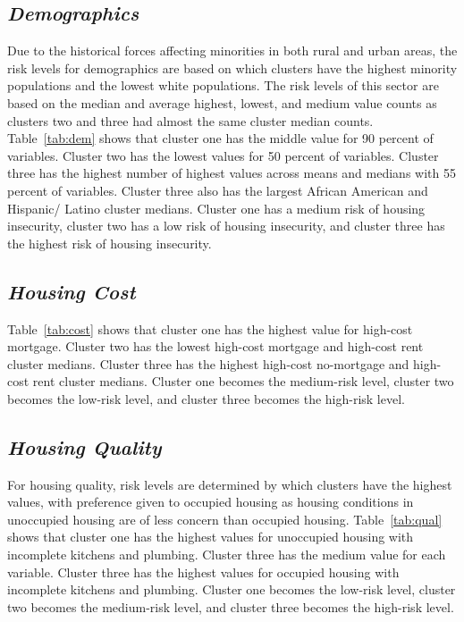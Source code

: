 \subsection{\textit{Demographics}}
Due to the historical forces affecting minorities in both rural and urban areas, the risk levels for demographics are based on which clusters have the highest minority populations and the lowest white populations. The risk levels of this sector are based on the median and average highest, lowest, and medium value counts as clusters two and three had almost the same cluster median counts. Table~\ref{tab:dem} shows that cluster one has the middle value for 90 percent of variables. Cluster two has the lowest values for 50 percent of variables. Cluster three has the highest number of highest values across means and medians with 55 percent of variables.  Cluster three also has the largest African American and Hispanic/ Latino cluster medians. Cluster one has a medium risk of housing insecurity, cluster two has a low risk of housing insecurity, and cluster three has the highest risk of housing insecurity. 



\pagebreak

\subsection{\textit{Housing Cost}}

Table~\ref{tab:cost} shows that cluster one has the highest value for high-cost mortgage. Cluster two has the lowest high-cost mortgage and high-cost rent cluster medians. Cluster three has the highest high-cost no-mortgage and high-cost rent cluster medians. Cluster one becomes the medium-risk level, cluster two becomes the low-risk level, and cluster three becomes the high-risk level. 



\subsection{\textit{Housing Quality}}
For housing quality, risk levels are determined by which clusters have the highest values, with preference given to occupied housing as housing conditions in unoccupied housing are of less concern than occupied housing. Table~\ref{tab:qual} shows that cluster one has the highest values for unoccupied housing with incomplete kitchens and plumbing. Cluster three has the medium value for each variable. Cluster three has the highest values for occupied housing with incomplete kitchens and plumbing. Cluster one becomes the low-risk level, cluster two becomes the medium-risk level, and cluster three becomes the high-risk level. 

